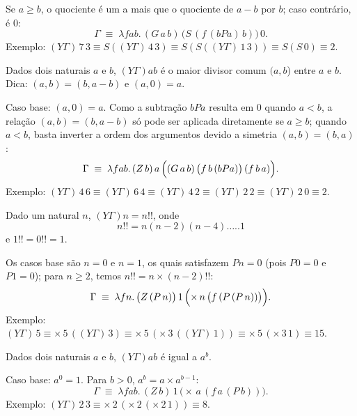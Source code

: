 {{\begin{Qlist}
        \begin{solution}
        Se $a\geq b$, o quociente é um a mais que o quociente de $a-b$ por $b$; caso contrário, é $0$:
        \[
            \Gamma \;\equiv\; \lambda fab.\,(G\,a\,b)\,\bigl(S\,(f\,(bPa)\,b)\bigr)\,0.
        \]
        Exemplo: $(Y\Gamma)\,7\,3 \equiv S((Y\Gamma)\,4\,3) \equiv S(S((Y\Gamma)\,1\,3))
        \equiv S(S\,0) \equiv 2$.

        \end{solution}

        \item[(d)] Dados dois naturais $a$ e $b$, $(Y\Gamma)ab$ é o maior divisor comum $(a, b$) entre $a$ e 
            $b$. Dica: $(a, b) = (b, a - b)$ e $(a, 0) = a$.

        \begin{solution}
        Caso base: $(a,0) = a$. Como a subtração $bPa$ resulta em $0$ quando $a<b$, a relação $(a,b)=(b,a-b)$ só pode ser aplicada diretamente se $a\geq b$; quando $a<b$, basta inverter a ordem dos argumentos devido a simetria $(a,b)=(b,a)$:
        \[
            \Gamma \;\equiv\; \lambda fab.\,(Z\,b)\,a\,\Bigl((G\,a\,b)\,\bigl(f\,b\,(bPa)\bigr)\,(f\,b\,a)\Bigr).
        \]
        Exemplo: $(Y\Gamma)\,4\,6 \equiv (Y\Gamma)\,6\,4 \equiv (Y\Gamma)\,4\,2 \equiv (Y\Gamma)\,2\,2
        \equiv (Y\Gamma)\,2\,0 \equiv 2$.
        \end{solution}

        \item[(e)] Dado um natural $n$, $(Y\Gamma)n = n!!$, onde 
        \[
            n!! = n(n - 2)(n - 4)\ldots .. 1
        \]
        e $1!! = 0!! = 1$.

        \begin{solution}
        Os casos base são $n=0$ e $n=1$, os quais satisfazem $Pn = 0$ (pois $P0=0$ e $P1=0$); para $n\geq 2$, temos $n!! = n\times(n-2)!!$:
        \[
            \Gamma \;\equiv\; \lambda fn.\,\bigl(Z\,(P\,n)\bigr)\,1\,\Bigl(\times\,n\,\bigl(f\,(P\,(P\,n))\bigr)\Bigr).
        \]
        Exemplo: $(Y\Gamma)\,5 \equiv \times\,5\,((Y\Gamma)\,3) \equiv \times\,5\,(\times\,3\,((Y\Gamma)\,1))
        \equiv \times\,5\,(\times\,3\,1) \equiv 15$.
        \end{solution}

        \item[(f)] Dados dois naturais $a$ e $b$, $(Y\Gamma)ab$ é igual a $a^b$.

        \begin{solution}
        Caso base: $a^0 = 1$. Para $b>0$, $a^b = a\times a^{b-1}$:
        \[
            \Gamma \;\equiv\; \lambda fab.\,(Z\,b)\,1\,\bigl(\times\,a\,(f\,a\,(P\,b))\bigr).
        \]
        Exemplo: $(Y\Gamma)\,2\,3 \equiv \times\,2\,(\times\,2\,(\times\,2\,1)) \equiv 8$.
        \end{solution}


\end{Qlist}}}
